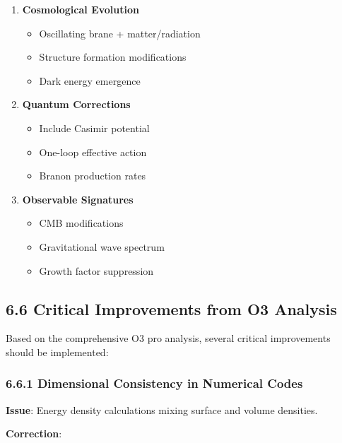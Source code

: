 \documentclass[
  11pt,
]{report}
\providecommand{\tightlist}{%
  \setlength{\itemsep}{0pt}\setlength{\parskip}{0pt}}
\begin{document}
\begin{enumerate}
\def\labelenumi{\arabic{enumi}.}
\tightlist
\item
  \textbf{Cosmological Evolution}

  \begin{itemize}
  \tightlist
  \item
    Oscillating brane + matter/radiation
  \item
    Structure formation modifications
  \item
    Dark energy emergence
  \end{itemize}
\item
  \textbf{Quantum Corrections}

  \begin{itemize}
  \tightlist
  \item
    Include Casimir potential
  \item
    One-loop effective action
  \item
    Branon production rates
  \end{itemize}
\item
  \textbf{Observable Signatures}

  \begin{itemize}
  \tightlist
  \item
    CMB modifications
  \item
    Gravitational wave spectrum
  \item
    Growth factor suppression
  \end{itemize}
\end{enumerate}

\subsection{6.6 Critical Improvements from O3
Analysis}\label{critical-improvements-from-o3-analysis}

Based on the comprehensive O3 pro analysis, several critical
improvements should be implemented:

\subsubsection{6.6.1 Dimensional Consistency in Numerical
Codes}\label{dimensional-consistency-in-numerical-codes}

\textbf{Issue}: Energy density calculations mixing surface and volume
densities.

\textbf{Correction}:
\end{document}
